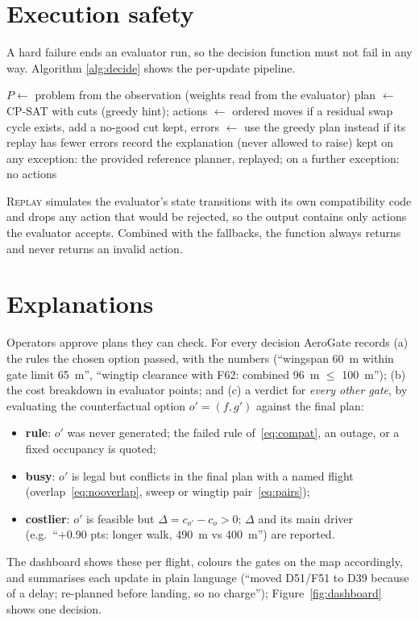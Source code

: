 \documentclass[11pt]{article}
\theoremstyle{remark}
\begin{document}
\section{Execution safety}\label{sec:safety}
A hard failure ends an evaluator run, so the decision function must not fail in any way. Algorithm
\ref{alg:decide} shows the per-update pipeline.

\begin{algorithm}[htbp]
\caption{Decision at one update}\label{alg:decide}
\begin{algorithmic}[1]
  \State $P\gets$ problem from the observation (weights read from the evaluator)
  \Repeat {}
    \State plan $\gets$ CP-SAT with cuts (greedy hint); actions $\gets$ ordered moves
    \State if a residual swap cycle exists, add a no-good cut
  \State kept, errors $\gets$  
   \State use the greedy plan instead if its replay has fewer errors \EndIf
  \State record the explanation (never allowed to raise)
  \State \Return kept
\EndFunction
\State on any exception: the provided reference planner, replayed; on a further exception: no actions
\end{algorithmic}
\end{algorithm}

\textsc{Replay} simulates the evaluator's state transitions with its own compatibility code and drops
any action that would be rejected, so the output contains only actions the evaluator accepts. Combined
with the fallbacks, the function always returns and never returns an invalid action.

\section{Explanations}\label{sec:explain}
Operators approve plans they can check. For every decision AeroGate records (a) the rules the chosen
option passed, with the numbers (``wingspan 60~m within gate limit 65~m'', ``wingtip clearance with
F62: combined 96~m $\le$ 100~m''); (b) the cost breakdown in evaluator points; and (c) a verdict for
\emph{every other gate}, by evaluating the counterfactual option $o'=(f,g')$ against the final plan:
\begin{itemize}[leftmargin=*,itemsep=1pt]
\item \textbf{rule}: $o'$ was never generated; the failed rule of~\eqref{eq:compat}, an outage, or a fixed occupancy is quoted;
\item \textbf{busy}: $o'$ is legal but conflicts in the final plan with a named flight
      (overlap~\eqref{eq:nooverlap}, sweep or wingtip pair~\eqref{eq:pairs});
\item \textbf{costlier}: $o'$ is feasible but $\Delta=c_{o'}-c_o>0$; $\Delta$ and its main driver
      (e.g.\ ``+0.90 pts: longer walk, 490~m vs 400~m'') are reported.
\end{itemize}
The dashboard shows these per flight, colours the gates on the map accordingly, and summarises each
update in plain language (``moved D51/F51 to D39 because of a delay; re-planned before landing, so no
charge''); Figure~\ref{fig:dashboard} shows one decision.
\end{document}
